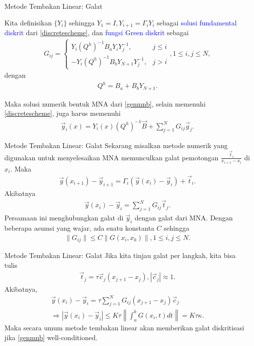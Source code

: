 \documentclass[xcolor={dvipsnames}, 9pt]{beamer}
\renewcommand{\emph}[1]{\textcolor{Blue}{#1}}
\begin{document}
	\begin{frame}{Metode Tembakan Linear: Galat}
		\begin{definition}
			Kita definisikan $\{Y_i\}$ sehingga $Y_1 = I, Y_{i+1} = \Gamma_iY_i$ sebagai \emph{solusi fundamental diskrit} dari \eqref{discretescheme}, dan \emph{fungsi Green diskrit} sebagai
			\begin{align*}
				G_{ij} = \begin{cases}
					Y_i(Q^h)^{-1}B_aY_iY_j^{-1}, & j \leq i \\
					-Y_i(Q^h)^{-1}B_bY_{N+1}Y_j^{-1}, & j > i
				\end{cases},
				1 \leq i, j \leq N,
			\end{align*}
			dengan
			\begin{align*}
				Q^h = B_a + B_bY_{N+1}.
			\end{align*}
		\end{definition}
		Maka solusi numerik bentuk MNA dari \eqref{genmnb}, selain memenuhi \eqref{discretescheme}, juga harus memenuhi
		\begin{align*}
			\vec{y}_i(x) = Y_i(x)(Q^h)^{-1}\vec{B} + \sum_{j=1}^{N} G_{ij}\vec{g}_j.
		\end{align*}
	\end{frame}
	\begin{frame}{Metode Tembakan Linear: Galat}
		Sekarang misalkan metode numerik yang digunakan untuk menyelesaikan MNA memunculkan galat pemotongan $\frac{\vec{t}_i}{x_{i+1}-x_i}$ di $x_i$. Maka
		\begin{align*}
			\vec{y}(x_{i+1}) - \vec{y}_{i+1} = \Gamma_i(\vec{y}(x_i)-\vec{y}_i) + \vec{t}_i.
		\end{align*}
		Akibatnya
		\begin{align*}
			\vec{y}(x_i) - \vec{y}_i = \sum_{j=1}^N G_{ij}\vec{t}_j.
		\end{align*}
		Persamaan ini menghubungkan galat di $\vec{y}_i$ dengan galat dari MNA. \newline
		Dengan beberapa asumsi yang wajar, ada suatu konstanta $C$ sehingga
		\begin{align*}
			\|G_{ij}\| \leq C \|G(x_i,x_k)\|, 1\leq i,j \leq N.
		\end{align*}
	\end{frame}
	\begin{frame}{Metode Tembakan Linear: Galat}
		Jika kita tinjau galat per langkah, kita bisa tulis
		\begin{align*}
			\vec{t}_j = \tau \vec{c}_j(x_{j+1}-x_j), |\vec{c}_j| \approx 1.
		\end{align*}
		Akibatnya,
		\begin{gather*}
			\vec{y}(x_i) - \vec{y}_i = \tau \sum_{j=1}^{N}G_{ij}(x_{j+1}-x_j)\vec{c}_j \\
			\Rightarrow |\vec{y}(x_i) - \vec{y}_i| \leq K\tau \left\|\int_a^b G(x_i,t) dt\right\| = K\tau\kappa.
		\end{gather*}
		Maka secara umum metode tembakan linear akan memberikan galat diskritisasi jika \eqref{genmnb} well-conditioned.
	\end{frame}
\end{document}
